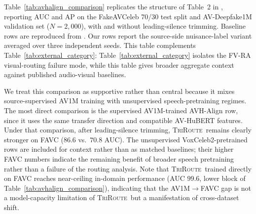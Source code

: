 \documentclass{article}
\newcommand{\method}{\textsc{TriRoute}}
\begin{document}
Table~\ref{tab:avhalign_comparison} replicates the structure of Table~2 in \citet{smeu2025avhalign}, reporting AUC and AP on the FakeAVCeleb 70/30 test split and AV-Deepfake1M validation set ($N=2{,}000$), with and without leading-silence trimming. Baseline rows are reproduced from \citet{smeu2025avhalign}. Our rows report the source-side nuisance-label variant averaged over three independent seeds. This table complements Table~\ref{tab:external_category}: Table~\ref{tab:external_category} isolates the FV-RA visual-routing failure mode, while this table gives broader aggregate context against published audio-visual baselines.

We treat this comparison as supportive rather than central because it mixes source-supervised AV1M training with unsupervised speech-pretraining regimes. The most direct comparison is the supervised AV1M-trained AVH-Align row, since it uses the same transfer direction and compatible AV-HuBERT features. Under that comparison, after leading-silence trimming, \method\ remains clearly stronger on FAVC ($86.6$ vs.\ $70.8$ AUC). The unsupervised VoxCeleb2-pretrained rows are included for context rather than as matched baselines; their higher FAVC numbers indicate the remaining benefit of broader speech pretraining rather than a failure of the routing analysis.
Note that \method\ trained directly on FAVC reaches near-ceiling in-domain performance (AUC $99.6$, lower block of Table~\ref{tab:avhalign_comparison}), indicating that the AV1M$\rightarrow$FAVC gap is not a model-capacity limitation of \method\ but a manifestation of cross-dataset shift.
\end{document}
